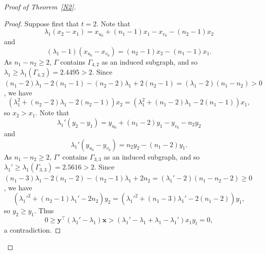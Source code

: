 \documentclass[12pt]{article}
\numberwithin{equation}{section}
\begin{document}
\begin{proof}[Proof of Theorem~\ref{N2}]
\begin{proof}
Suppose first that $t=2$. 
Note that 
\[
\lambda_1(x_2-x_1)=x_{u_0}+(n_1-1)x_1-x_{v_0}-(n_2-1)x_2
\]
and
\[
(\lambda_1-1)(x_{u_0}-x_{v_0})=(n_2-1)x_2-(n_1-1)x_1.
\]
As $n_1-n_2\ge 2$, $\Gamma$ contains $\Gamma_{4,2}$ as an induced subgraph, and so $\lambda_1\ge \lambda_1(\Gamma_{4,2})=2.4495>2$. 
Since $(n_1-2)\lambda_1-2(n_1-1)-(n_2-2)\lambda_1+2(n_2-1)=(\lambda_1-2)(n_1-n_2)>0$, we have 
\[
\left(\lambda_1^2+(n_2-2)\lambda_1-2(n_2-1)\right)x_2=\left(\lambda_1^2+(n_1-2)\lambda_1-2(n_1-1)\right)x_1,  
\]
so $x_2>x_1$. 
Note that 
\[
\lambda_1'(y_2-y_1)=y_{u_0}+(n_1-2)y_1-y_{v_0}-n_2y_2
\]
and
\[
\lambda_1'(y_{u_0}-y_{v_0})=n_2y_2-(n_1-2)y_1. 
\]
As $n_1-n_2\ge 2$, $\Gamma'$ contains $\Gamma_{3,3}$ as an induced subgraph, and so $\lambda_1'\ge \lambda_1(\Gamma_{3,3})=2.5616>2$. 
Since $(n_1-3)\lambda_1-2(n_1-2)-(n_2-1)\lambda_1+2n_2=(\lambda_1'-2)(n_1-n_2-2)\ge 0$, we have 
\[
\left(\lambda_1'^2+(n_2-1)\lambda_1'-2n_2\right)y_2=\left(\lambda_1'^2+(n_1-3)\lambda_1'-2(n_1-2)\right)y_1,  
\]
so $y_2\ge y_1$. Thus
\[
0 \ge\mathbf{y}^\top(\lambda_1'-\lambda_1)\mathbf{x}>(\lambda_1'-\lambda_1+\lambda_1-\lambda_1')x_1y_t=0, 
\]
a contradiction. 


\end{proof}
\end{proof}
\end{document}
